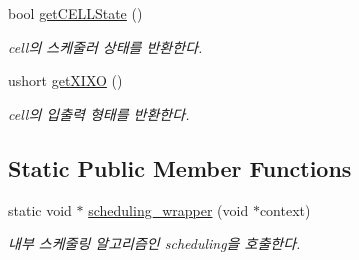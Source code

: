 \begin{DoxyCompactItemize}
bool \hyperlink{classCELL_aa9a99d28684e6b16841851f4e42fcc18}{get\+C\+E\+L\+L\+State} ()
\begin{DoxyCompactList}\small\item\em cell의 스케줄러 상태를 반환한다. \end{DoxyCompactList}\item 
ushort \hyperlink{classCELL_a96407db1499c2bd1d03d23c12e7e1821}{get\+X\+I\+X\+O} ()
\begin{DoxyCompactList}\small\item\em cell의 입출력 형태를 반환한다. \end{DoxyCompactList}\end{DoxyCompactItemize}
\subsection*{Static Public Member Functions}
\begin{DoxyCompactItemize}
\item 
static void $\ast$ \hyperlink{classCELL_a9af98a9c48fa039b109f3e7bbdedf3b5}{scheduling\+\_\+wrapper} (void $\ast$context)
\begin{DoxyCompactList}\small\item\em 내부 스케줄링 알고리즘인 scheduling을 호출한다. \end{DoxyCompactList}\end{DoxyCompactItemize}
